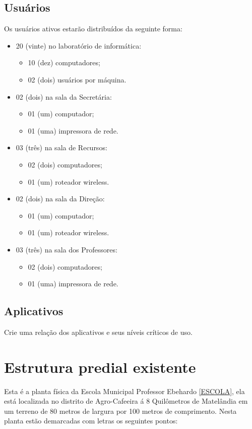 \documentclass[	DIV=calc,%
							paper=a4,%
							fontsize=12pt,%
							onecolumn]{scrartcl}	 					%
\begin{document}
\subsection{Usuários}
Os usuários ativos estarão distribuídos da seguinte forma:
\begin{itemize}
	\item 20 (vinte) no laboratório de informática:
		\begin{itemize}
			\item 10 (dez) computadores;
			\item 02 (dois) usuários por máquina.
		\end{itemize}
	\item 02 (dois) na sala da Secretária:
	   \begin{itemize}
	   	\item 01 (um) computador; 
	   	\item 01 (uma) impressora de rede.
	   \end{itemize} 
	\item 03 (três) na sala de Recursos:
		\begin{itemize}
			\item 02 (dois) computadores;
			\item 01 (um) roteador wireless.
		\end{itemize}
	\item 02 (dois) na sala da Direção:
		\begin{itemize}
			\item 01 (um) computador;
			\item 01 (um) roteador wireless.
		\end{itemize}
	\item 03 (três) na sala dos Professores:
		\begin{itemize}
			\item 02 (dois) computadores;
			\item 01 (uma) impressora de rede.
		\end{itemize}
\end{itemize}
\subsection{Aplicativos}
Crie uma relação dos aplicativos e seus níveis críticos de uso.

\section{Estrutura predial existente}
Esta é a planta física da Escola Municipal Professor Ebehardo \ref{ESCOLA}, ela está localizada no distrito de Agro-Cafeeira á 8 Quilômetros de Matelândia em um terreno de 80 metros de largura por 100 metros de comprimento.
Nesta planta estão demarcadas com letras os seguintes pontos:
\end{document}
